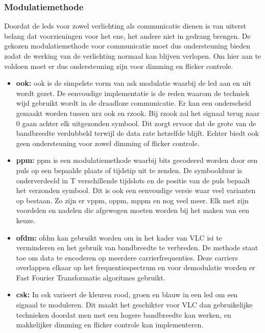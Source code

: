 \subsubsection{Modulatiemethode}
Doordat de \glspl{led} voor zowel verlichting als communicatie dienen is van uiterst belang dat voorzieningen voor het ene, het andere niet in gedrang brengen. De gekozen modulatiemethode voor communicatie moet dus ondersteuning bieden zodat de werking van de verlichting normaal kan blijven verlopen. Om hier aan te voldoen moet er dus ondersteuning zijn voor dimming en flicker controle.
\begin{itemize}
	\item \textbf{\acrfull{ook}:} \gls{ook} is de simpelste vorm van \acrfull{ask} modulatie waarbij de \gls{led} aan en uit wordt gezet. De eenvoudige implementatie is de reden waarom de techniek wijd gebruikt wordt in de draadloze communicatie. Er kan een onderscheid gemaakt worden tussen \acrfull{nrz} \gls{ook} en \acrfull{rz}\gls{ook}. Bij \gls{rz}\gls{ook} zal het signaal terug naar 0 gaan achter elk uitgezonden symbool. Dit zorgt ervoor dat de grote van de bandbreedte verdubbeld terwijl de data rate hetzelfde blijft. Echter biedt \gls{ook} geen ondersteuning voor zowel dimming of flicker controle.
	
	\item \textbf{\acrfull{ppm}:} \gls{ppm} is een modulatiemethode waarbij bits gecodeerd worden door een puls op een bepaalde plaats of tijdstip uit te zenden. De symboolduur is onderverdeeld in T verschillende tijdslots en de positie van de puls bepaalt het verzonden symbool. Dit is ook een eenvoudige versie waar veel varianten op bestaan. Zo zijn er \acrfull{vppm}, \acrfull{oppm}, \acrfull{mppm} en nog veel meer. Elk met zijn voordelen en nadelen die afgewogen moeten worden bij het maken van een keuze. 
	
	\item \textbf{\acrfull{ofdm}:} \gls{ofdm} kan gebruikt worden om in het kader van VLC \acrfull{isi} te verminderen en het gebruik van bandbreedte te verbreden. De methode staat toe om data te encoderen op meerdere carrierfrequenties. Deze carriers overlappen elkaar op het frequentiespectrum en voor demodulatie worden er Fast Fourier Transformatie algoritmes gebruikt.
	
	\item \textbf{\acrfull{csk}:} In \gls{csk} varieert de kleuren rood, groen en blauw in een \gls{led} om een signaal te moduleren. Dit maakt het geschikter voor VLC dan gebruikelijke technieken doordat men met een hogere bandbreedte kan werken, en makkelijker dimming en flicker controle kan implementeren.
\end{itemize}

